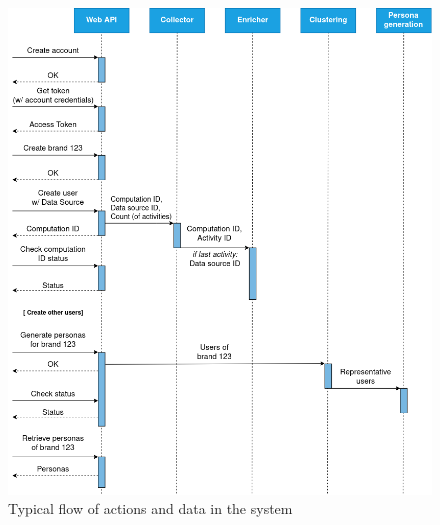 \begin{figure}
\centering
\includegraphics[width=\textwidth]{img/SystemFlow.png}
\caption{Typical flow of actions and data in the system}
\label{fig:flow}
\end{figure}
